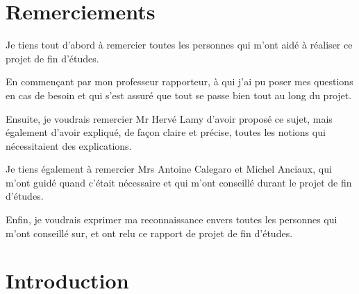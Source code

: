 \documentclass[11pt]{article}
\newenvironment{remerciements}
  {
   \thispagestyle{empty}%
   \vspace*{\stretch{1}}%
   \itshape             %
  }
  {\par %
   \vspace{\stretch{3}} %
   \clearpage           %
  }
\begin{document}
\section*{Remerciements}
\begin{remerciements}
    Je tiens tout d'abord à remercier toutes les personnes qui m'ont aidé à réaliser ce projet de fin d'études.\\
    \par
    En commençant par mon professeur rapporteur, à qui j'ai pu poser mes questions en cas de besoin et qui s'est assuré que tout se passe bien tout au long du projet.\\
    \par
    Ensuite, je voudrais remercier Mr Hervé Lamy d'avoir proposé ce sujet, mais également d'avoir expliqué, de façon claire et précise, toutes les notions qui nécessitaient des explications.\\
    \par
    Je tiens également à remercier Mrs Antoine Calegaro et Michel Anciaux, qui m'ont guidé quand c'était nécessaire et qui m'ont conseillé durant le projet de fin d'études.\\
    \par
    Enfin, je voudrais exprimer ma reconnaissance envers toutes les personnes qui m'ont conseillé sur, et ont relu ce rapport de projet de fin d'études.
\end{remerciements}

\newpage

\tableofcontents

\newpage

\section{Introduction}
\end{document}
